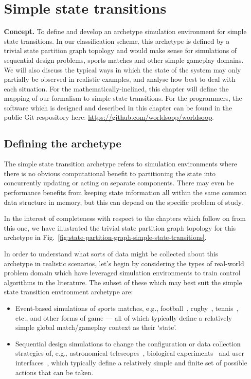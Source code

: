 \chapter{\sffamily Simple state transitions}

{\bfseries\sffamily Concept.} To define and develop an archetype simulation environment for simple state transitions. In our classification scheme, this archetype is defined by a trivial state partition graph topology and would make sense for simulations of sequential design problems, sports matches and other simple gameplay domains. We will also discuss the typical ways in which the state of the system may only partially be observed in realistic examples, and analyse how best to deal with each situation. For the mathematically-inclined, this chapter will define the mapping of our formalism to simple state transitions. For the programmers, the software which is designed and described in this chapter can be found in the public Git respository here: \href{https://github.com/worldsoop/worldsoop}{https://github.com/worldsoop/worldsoop}.


\section{\sffamily Defining the archetype}

The simple state transition archetype refers to simulation environments where there is no obvious computational benefit to partitioning the state into concurrently updating or acting on separate components. There may even be performance benefits from keeping state information all within the same common data structure in memory, but this can depend on the specific problem of study. 

In the interest of completeness with respect to the chapters which follow on from this one, we have illustrated the trivial state partition graph topology for this archetype in Fig.~\ref{fig:state-partition-graph-simple-state-transitions}.

In order to understand what sorts of data might be collected about this archetype in realistic scenarios, let's begin by considering the types of real-world problem domain which have leveraged simulation environments to train control algorithms in the literature. The subset of these which may best suit the simple state transition environment archetype are:
\begin{itemize}
\item{Event-based simulations of sports matches, e.g., football~\cite{pulis2022reinforcement}, rugby~\cite{sawczuk2022markov}, tennis~\cite{ding2022deep}, etc., and other forms of game --- all of which typically define a relatively simple global match/gameplay context as their `state'.}
\item{Sequential design simulations to change the configuration or data collection strategies of, e.g., astronomical telescopes~\cite{jia2023observation,yatawatta2021deep}, biological experiments~\cite{treloar2022deep} and user interfaces~\cite{lomas2016interface}, which typically define a relatively simple and finite set of possible actions that can be taken.}
\end{itemize}

